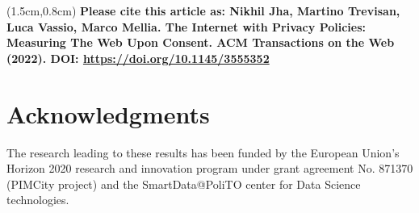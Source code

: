 \documentclass[acmsmall,authorversion]{acmart}
\begin{document}




\maketitle
\thispagestyle{empty}

\TPshowboxestrue
\TPMargin{0.3cm}
\begin{textblock*}{14cm}(1.5cm,0.8cm)
\small
\bf
{}
\color{myRed}
\noindent
Please cite this article as: Nikhil Jha, Martino Trevisan, Luca Vassio, Marco Mellia. The Internet with Privacy Policies: Measuring The Web Upon Consent. ACM Transactions on the Web (2022). DOI: \url{https://doi.org/10.1145/3555352}
\end{textblock*}







\section*{Acknowledgments}
The research leading to these results has been funded by the European Union's Horizon 2020 research and innovation program under grant agreement No. 871370 (PIMCity project) and the SmartData@PoliTO center for Data Science technologies.





\end{document}

